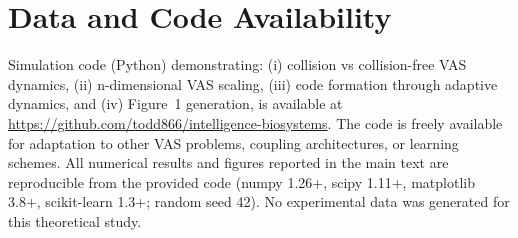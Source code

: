 \documentclass[12pt]{article}
\begin{document}
\section*{Data and Code Availability}
Simulation code (Python) demonstrating: (i) collision vs collision-free VAS dynamics, (ii) n-dimensional VAS scaling, (iii) code formation through adaptive dynamics, and (iv) Figure~1 generation, is available at \url{https://github.com/todd866/intelligence-biosystems}. The code is freely available for adaptation to other VAS problems, coupling architectures, or learning schemes. All numerical results and figures reported in the main text are reproducible from the provided code (numpy 1.26+, scipy 1.11+, matplotlib 3.8+, scikit-learn 1.3+; random seed 42). No experimental data was generated for this theoretical study.

\end{document}
